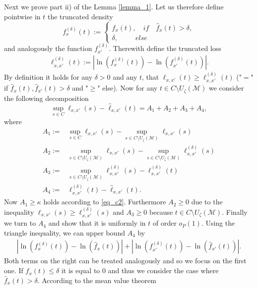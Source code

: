 \documentclass[conference]{IEEEtran}
\begin{document}
Next we prove part ii) of the Lemma \ref{lemma_1}.
Let us therefore define pointwise in $t$ the truncated density
$$
f_x^{(\delta)} (t) := \begin{cases} f_x (t), \quad if \quad \hat f_x(t)>\delta,\\
\delta, \quad\quad\,\,\, else \end{cases}
$$
and analogously the function $f_{x'}^{(\delta)}$. Therewith define the truncated loss
\begin{align} \label{Eq_delta_ell}
\ell^{(\delta)}_{x,x'}(t) := |\ln(f_x^{(\delta)} (t))-\ln(f_{x'}^{(\delta)}(t))|.
\end{align}
By definition it holds for any $\delta>0$ and any $t$, that $\ell_{x,x'}(t)\ge \ell^{(\delta)}_{x,x'}(t)$ ("$=$" if $\hat f_x(t), \hat f_{x'}(t)>\delta$ and "$\ge$" else). Now for any $t \in C \setminus U_\zeta(\mathcal{M})$ we consider the following decomposition
\begin{equation} \label{Eq_A_decomposition}
     \sup_{s \in C}\ell_{x,x'}(s) - \hat \ell_{x,x'}(t) = A_1+A_2+A_3+A_4,
\end{equation}
where
\begin{align*}
    A_1 := & \sup_{s \in C}\ell_{x,x'}(s) - \sup_{s \in C \setminus U_\zeta(\mathcal{M})}\ell_{x,x'}(s)\\
    A_2 := & \sup_{s \in C \setminus U_\zeta(\mathcal{M})}\ell_{x,x'}(s) - \sup_{s \in C \setminus U_\zeta(\mathcal{M})}\ell^{(\delta)}_{x,x'}(s)\\
    A_3 := &\sup_{s \in C \setminus U_\zeta(\mathcal{M})}\ell^{(\delta)}_{x,x'}(s) - \ell^{(\delta)}_{x,x'}(t)\\
    A_4 := & \ell^{(\delta)}_{x,x'}(t) - \hat \ell_{x,x'}(t).
\end{align*}
Now $A_1 \ge \kappa$ holds according to \eqref{eq_c2}. Furthermore $A_2 \ge 0$ due to the inequality $\ell_{x,x'}(s)\ge \ell^{(\delta)}_{x,x'}(s)$ and $A_3 \ge 0$ because $t \in C \setminus U_\zeta(\mathcal{M})$. Finally we turn to $A_4$ and show that it is uniformly in $t$ of order $o_P(1)$. Using the triangle inequality, we can upper bound $A_4$ by
\begin{align*}
    |\ln( f_{x}^{(\delta)}(t))-\ln( \hat f_{x}(t)) | + |\ln( f_{x'}^{(\delta)}(t))-\ln( \hat f_{x'}(t)) |.
\end{align*}
Both terms on the right can be treated analogously and so we focus on the first one. If $ \hat f_{x}(t) \le \delta$ it is equal to $0$ and thus we consider the case where $ \hat f_{x}(t) > \delta$. According to the mean value theorem 
\end{document}
